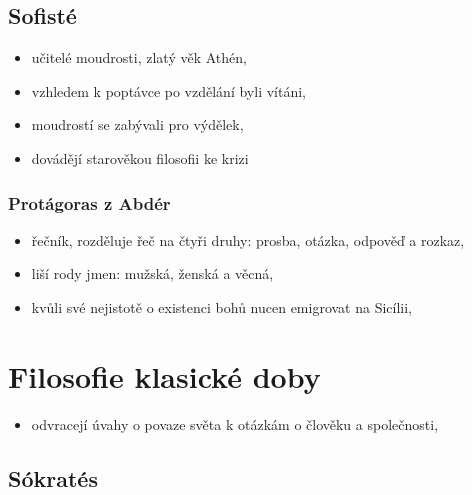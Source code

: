 \documentclass[11pt,a4paper,czech]{article}
\begin{document}
\subsection{Sofisté}

    \begin{itemize}
        \item učitelé moudrosti, zlatý věk Athén,
        \item vzhledem k poptávce po vzdělání byli vítáni,
        \item moudrostí se zabývali pro výdělek,
        \item dovádějí starověkou filosofii ke krizi
    \end{itemize}

    \subsubsection{Protágoras z Abdér}

    \begin{itemize}
        \item řečník, rozděluje řeč na čtyři druhy: prosba, otázka, odpověď a rozkaz,
        \item liší rody jmen: mužská, ženská a věcná,
        \item kvůli své nejistotě o existenci bohů nucen emigrovat na Sicílii,
    \end{itemize}

\section{Filosofie klasické doby}

    \begin{itemize}
        \item odvracejí úvahy o povaze světa k otázkám o člověku a společnosti,
    \end{itemize}

    \subsection{Sókratés}
\end{document}
